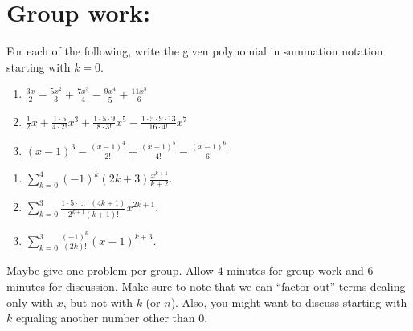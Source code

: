 \documentclass[noinstructornotes]{ximera}
\begin{document}
\section{Group work:}
\begin{problem}
For each of the following, write the given polynomial in summation notation starting with $k=0$.
	\begin{enumerate}
	
	\item  $\frac{3x}{2} - \frac{5x^2}{3} + \frac{7x^3}{4} - \frac{9x^4}{5} + \frac{11x^5}{6}$
	
	\item  $\frac{1}{2}x + \frac{1 \cdot 5}{4 \cdot 2!}x^3 + \frac{1 \cdot 5 \cdot 9}{8 \cdot 3!}x^5 - \frac{1 \cdot 5 \cdot 9 \cdot 13}{16 \cdot 4!}x^7$
	
	\item  $(x-1)^3 - \frac{(x-1)^4}{2!} + \frac{(x-1)^5}{4!} - \frac{(x-1)^6}{6!} $
	
	\end{enumerate}
	
	\begin{freeResponse}
	\begin{enumerate}
	
	\item  $\sum_{k=0}^4 (-1)^k (2k+3) \frac{x^{k+1}}{k+2}$.  
	
	\item  $\sum_{k=0}^3 \frac{1 \cdot 5 \cdot \hdots \cdot (4k+1)}{2^{k+1} (k+1)!} x^{2k+1}.$
	
	\item  $\sum_{k=0}^3 \frac{(-1)^k}{(2k)!} (x-1)^{k+3}$.  
	
	\end{enumerate}
	\end{freeResponse}
	
\begin{instructorNotes}
Maybe give one problem per group.  
Allow $4$ minutes for group work and $6$ minutes for discussion.  
Make sure to note that we can ``factor out'' terms dealing only with $x$, but not with $k$ (or $n$).  
Also, you might want to discuss starting with $k$ equaling another number other than $0$.
\end{instructorNotes}

\end{problem}
\end{document}

